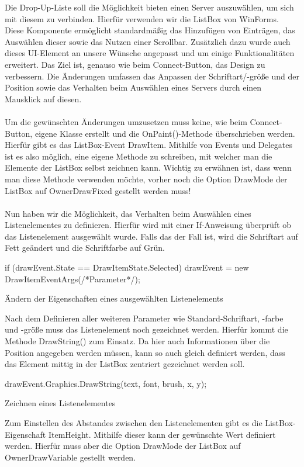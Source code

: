 Die Drop-Up-Liste soll die Möglichkeit bieten einen Server auszuwählen, um sich mit diesem zu verbinden. Hierfür verwenden wir die ListBox von WinForms. Diese Komponente ermöglicht standardmäßig das Hinzufügen von Einträgen, das Auswählen dieser sowie das Nutzen einer Scrollbar. Zusätzlich dazu wurde auch dieses UI-Element an unsere Wünsche angepasst und um einige Funktionalitäten erweitert. Das Ziel ist, genauso wie beim Connect-Button, das Design zu verbessern. Die Änderungen umfassen das Anpassen der Schriftart/-größe und der Position sowie das Verhalten beim Auswählen eines Servers durch einen Mausklick auf diesen.
\\ \ \\
Um die gewünschten Änderungen umzusetzen muss keine, wie beim Connect-Button, eigene Klasse erstellt und die OnPaint()-Methode überschrieben werden. Hierfür gibt es das ListBox-Event DrawItem. Mithilfe von Events und Delegates ist es also möglich, eine eigene Methode zu schreiben, mit welcher man die Elemente der ListBox selbst zeichnen kann. Wichtig zu erwähnen ist, dass wenn man diese Methode verwenden möchte, vorher noch die Option DrawMode der ListBox auf OwnerDrawFixed gestellt werden muss!
\\ \ \\
Nun haben wir die Möglichkeit, das Verhalten beim Auswählen eines Listenelementes zu definieren. Hierfür wird mit einer If-Anweisung überprüft ob das Listenelement ausgewählt wurde. Falls das der Fall ist, wird die Schriftart auf Fett geändert und die Schriftfarbe auf Grün.

\begin{program}[H]
\begin{CSharpCode}
if (drawEvent.State == DrawItemState.Selected)
{
    drawEvent = new DrawItemEventArgs(/*Parameter*/);
}
\end{CSharpCode}
\caption{Ändern der Eigenschaften eines ausgewählten Listenelements}
\end{program}
\noindent
Nach dem Definieren aller weiteren Parameter wie Standard-Schriftart, -farbe und -größe muss das Listenelement noch gezeichnet werden. Hierfür kommt die Methode DrawString() zum Einsatz. Da hier auch Informationen über die Position angegeben werden müssen, kann so auch gleich definiert werden, dass das Element mittig in der ListBox zentriert gezeichnet werden soll.

\begin{program}[H]
\begin{CSharpCode}
drawEvent.Graphics.DrawString(text, font, brush, x, y);
\end{CSharpCode}
\caption{Zeichnen eines Listenelementes}
\end{program}
\noindent
Zum Einstellen des Abstandes zwischen den Listenelementen gibt es die ListBox-Eigenschaft ItemHeight. Mithilfe dieser kann der gewünschte Wert definiert werden. Hierfür muss aber die Option DrawMode der ListBox auf OwnerDrawVariable gestellt werden.

